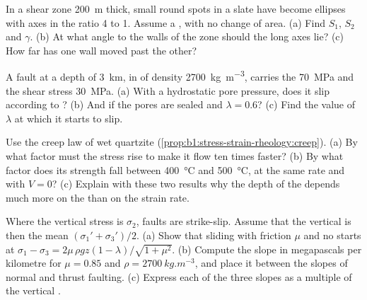 \begin{exercise}[$\star\star$]\label{exo:b1:stress-strain-rheology:7}
In a shear zone \qty{200}{m} thick, small round spots in a slate have become
ellipses with axes in the ratio 4 to 1. Assume a , with no change
of area. (a) Find $S_1$, $S_2$ and $\gamma$. (b) At what angle to the walls of
the zone should the long axes lie? (c) How far has one wall moved past the
other?
\end{exercise}

\begin{exercise}[$\star\star$]\label{exo:b1:stress-strain-rheology:8}
A fault at a depth of \qty{3}{km}, in  of density \qty{2700}{kg.m^{-3}},
carries the  \qty{70}{MPa} and the shear stress \qty{30}{MPa}.
(a) With a hydrostatic pore pressure, does it slip according to ? (b) And if the pores are sealed and $\lambda = 0.6$? (c) Find the value
of $\lambda$ at which it starts to slip.
\end{exercise}

\begin{exercise}[$\star\star$]\label{exo:b1:stress-strain-rheology:9}
Use the creep law of wet quartzite (\cref{prop:b1:stress-strain-rheology:creep}).
(a) By what factor must the stress rise to make it flow ten times faster?
(b) By what factor does its strength fall between \qty{400}{\degreeCelsius}
and \qty{500}{\degreeCelsius}, at the same rate and with $V = 0$? (c) Explain
with these two results why the depth of the 
depends much more on the  than on the strain rate.
\end{exercise}

\begin{exercise}[$\star\star\star$]\label{exo:b1:stress-strain-rheology:10}
Where the vertical stress is $\sigma_2$, faults are strike-slip. Assume that
the vertical  is then the mean $(\sigma_1' + \sigma_3')/2$.
(a) Show that sliding with friction $\mu$ and no  starts at
$\sigma_1 - \sigma_3 = 2\mu\,\rho g z(1-\lambda)/\sqrt{1+\mu^2}$. (b) Compute
the slope in megapascals per kilometre for $\mu = 0.85$ and
$\rho = \qty{2700}{kg.m^{-3}}$, and place it between the slopes of normal and
thrust faulting. (c) Express each of the three slopes as a multiple of the
vertical .
\end{exercise}

